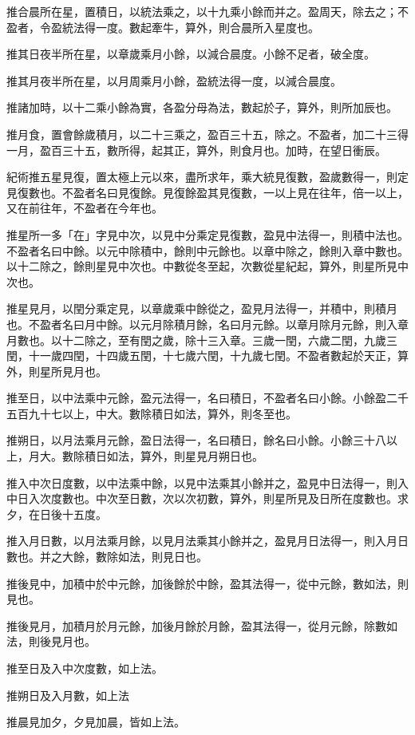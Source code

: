 \begin{pinyinscope}
推合晨所在星，置積日，以統法乘之，以十九乘小餘而并之。盈周天，除去之；不盈者，令盈統法得一度。數起牽牛，算外，則合晨所入星度也。

推其日夜半所在星，以章歲乘月小餘，以減合晨度。小餘不足者，破全度。

推其月夜半所在星，以月周乘月小餘，盈統法得一度，以減合晨度。

推諸加時，以十二乘小餘為實，各盈分母為法，數起於子，算外，則所加辰也。

推月食，置會餘歲積月，以二十三乘之，盈百三十五，除之。不盈者，加二十三得一月，盈百三十五，數所得，起其正，算外，則食月也。加時，在望日衝辰。

紀術推五星見復，置太極上元以來，盡所求年，乘大統見復數，盈歲數得一，則定見復數也。不盈者名曰見復餘。見復餘盈其見復數，一以上見在往年，倍一以上，又在前往年，不盈者在今年也。

推星所一多「在」字見中次，以見中分乘定見復數，盈見中法得一，則積中法也。不盈者名曰中餘。以元中除積中，餘則中元餘也。以章中除之，餘則入章中數也。以十二除之，餘則星見中次也。中數從冬至起，次數從星紀起，算外，則星所見中次也。

推星見月，以閏分乘定見，以章歲乘中餘從之，盈見月法得一，并積中，則積月也。不盈者名曰月中餘。以元月除積月餘，名曰月元餘。以章月除月元餘，則入章月數也。以十二除之，至有閏之歲，除十三入章。三歲一閏，六歲二閏，九歲三閏，十一歲四閏，十四歲五閏，十七歲六閏，十九歲七閏。不盈者數起於天正，算外，則星所見月也。

推至日，以中法乘中元餘，盈元法得一，名曰積日，不盈者名曰小餘。小餘盈二千五百九十七以上，中大。數除積日如法，算外，則冬至也。

推朔日，以月法乘月元餘，盈日法得一，名曰積日，餘名曰小餘。小餘三十八以上，月大。數除積日如法，算外，則星見月朔日也。

推入中次日度數，以中法乘中餘，以見中法乘其小餘并之，盈見中日法得一，則入中日入次度數也。中次至日數，次以次初數，算外，則星所見及日所在度數也。求夕，在日後十五度。

推入月日數，以月法乘月餘，以見月法乘其小餘并之，盈見月日法得一，則入月日數也。并之大餘，數除如法，則見日也。

推後見中，加積中於中元餘，加後餘於中餘，盈其法得一，從中元餘，數如法，則見也。

推後見月，加積月於月元餘，加後月餘於月餘，盈其法得一，從月元餘，除數如法，則後見月也。

推至日及入中次度數，如上法。

推朔日及入月數，如上法

推晨見加夕，夕見加晨，皆如上法。


\end{pinyinscope}
